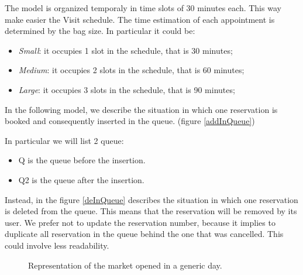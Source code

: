 The model is organized temporaly in time slots of 30 minutes each. This way make easier the Visit schedule. The time estimation of each appointment is determined by the bag size. In particular it could be:
\begin{itemize}
\item \textit{Small}: it occupies 1 slot in the schedule, that is 30 minutes;
\item \textit{Medium}: it occupies 2 slots in the schedule, that is 60 minutes;
\item \textit{Large}: it occupies 3 slots in the schedule, that is 90 minutes;
\end{itemize}


In the following model, we describe the situation in which one reservation is booked and consequently inserted in the queue. (figure \ref{addInQueue})

In particular we will list 2 queue:
\begin{itemize}
\item Q is the queue before the insertion.
\item Q2 is the queue after the insertion.
\end{itemize}



Instead, in the figure \ref{deInQueue} describes the situation in which one reservation is deleted from the queue.
This means that the reservation will be removed by its user.
We prefer not to update the reservation number, because it implies to duplicate all reservation in the queue behind the one that was cancelled. This could involve less readability.

\pagebreak



\pagebreak

\begin{figure}[H]
  \centering
    \caption{Representation of the market opened in a generic day.}
      \label{marketOpened}

\end{figure}

